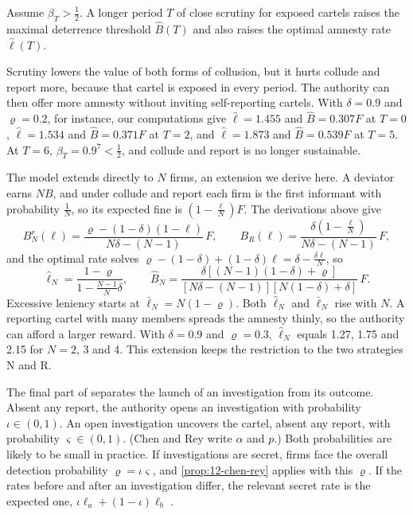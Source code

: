 \begin{proposition}\label{prop:12-scrutiny}
Assume $\beta_T > \frac{1}{2}$. A longer period $T$ of close scrutiny for exposed cartels raises the maximal
deterrence threshold $\hat B(T)$ and also raises the optimal amnesty rate $\hat\ell(T)$.
\end{proposition}

Scrutiny lowers the value of both forms of collusion, but it hurts collude and report more, because that cartel is
exposed in every period. The authority can then offer more amnesty without inviting self-reporting cartels. With
$\delta = 0.9$ and $\varrho = 0.2$, for instance, our computations give $\hat\ell = 1.455$ and $\hat B = 0.307F$ at
$T = 0$, $\hat\ell = 1.534$ and $\hat B = 0.371F$ at $T = 2$, and $\hat\ell = 1.873$ and $\hat B = 0.539F$ at
$T = 5$. At $T = 6$, $\beta_T = 0.9^7 < \frac{1}{2}$, and collude and report is no longer sustainable.

\begin{remark}\label{rem:12-cr-nfirms}
The model extends directly to $N$ firms, an extension we derive here. A deviator earns $NB$, and under collude and
report each firm is the first informant with probability $\frac{1}{N}$, so its expected fine is
$(1 - \frac{\ell}{N})F$. The derivations above give
\begin{equation*}
B_N^r(\ell) = \frac{\varrho - (1-\delta)(1-\ell)}{N\delta - (N-1)}\,F,\qquad
B_R(\ell) = \frac{\delta\left(1 - \frac{\ell}{N}\right)}{N\delta - (N-1)}\,F,
\end{equation*}
and the optimal rate solves $\varrho - (1-\delta) + (1-\delta)\ell = \delta - \frac{\delta\ell}{N}$, so
\begin{equation*}
\hat\ell_N = \frac{1 - \varrho}{1 - \frac{N-1}{N}\delta},\qquad
\hat B_N = \frac{\delta[(N-1)(1-\delta) + \varrho]}{[N\delta - (N-1)][N(1-\delta) + \delta]}\,F.
\end{equation*}
Excessive leniency starts at $\bar\ell_N = N(1-\varrho)$. Both $\hat\ell_N$ and $\bar\ell_N$ rise with $N$. A reporting
cartel with many members spreads the amnesty thinly, so the authority can afford a larger reward. With $\delta = 0.9$
and $\varrho = 0.3$, $\hat\ell_N$ equals 1.27, 1.75 and 2.15 for $N = 2$, 3 and 4. This extension keeps the restriction
to the two strategies N and R.
\end{remark}

The final part of \citet[Section~4]{ChenRey2013} separates the launch of an investigation from its outcome. Absent any
report, the authority opens an investigation with probability $\iota \in (0,1)$. An open investigation uncovers the
cartel, absent any report, with probability $\varsigma \in (0,1)$. (Chen and Rey write $\alpha$ and $p$.) Both
probabilities are likely to be small in practice. If investigations are secret, firms face the overall detection
probability $\varrho = \iota\varsigma$, and \cref{prop:12-chen-rey} applies with this $\varrho$. If the rates before
and after an investigation differ, the relevant secret rate is the expected one, $\iota\ell_a + (1-\iota)\ell_b$
\citep[footnote~22]{ChenRey2013}.

